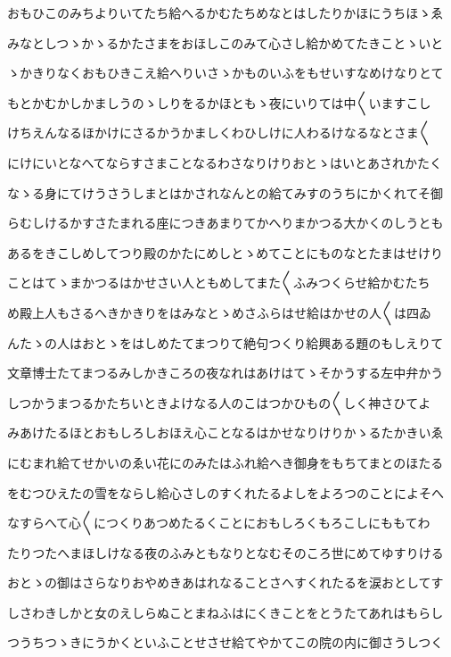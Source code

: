 \documentclass[a4paper,11pt,landscape]{ltjtarticle}
\begin{document}
おもひこのみちよりいてたち給へるかむたちめなとはしたりかほにうちほゝゑ
\par\medskip
みなとしつゝかゝるかたさまをおほしこのみて心さし給かめてたきことゝいと
\par\medskip
ゝかきりなくおもひきこえ給へりいさゝかものいふをもせいすなめけなりとて
\par\medskip
もとかむかしかましうのゝしりをるかほともゝ夜にいりては中〱いますこし
\par\medskip
けちえんなるほかけにさるかうかましくわひしけに人わるけなるなとさま〱
\par\medskip
にけにいとなへてならすさまことなるわさなりけりおとゝはいとあされかたく
\par\medskip
なゝる身にてけうさうしまとはかされなんとの給てみすのうちにかくれてそ御
\par\medskip
らむしけるかすさたまれる座につきあまりてかへりまかつる大かくのしうとも
\par\medskip
あるをきこしめしてつり殿のかたにめしとゝめてことにものなとたまはせけり
\par\medskip
ことはてゝまかつるはかせさい人ともめしてまた〱ふみつくらせ給かむたち
\par\medskip
め殿上人もさるへきかきりをはみなとゝめさふらはせ給はかせの人〱は四ゐ
\par\medskip
んたゝの人はおとゝをはしめたてまつりて絶句つくり給興ある題のもしえりて
\par\medskip
文章博士たてまつるみしかきころの夜なれはあけはてゝそかうする左中弁かう
\par\medskip
しつかうまつるかたちいときよけなる人のこはつかひもの〱しく神さひてよ
\par\medskip
みあけたるほとおもしろしおほえ心ことなるはかせなりけりかゝるたかきいゑ
\par\medskip
にむまれ給てせかいのゑい花にのみたはふれ給へき御身をもちてまとのほたる
\par\medskip
をむつひえたの雪をならし給心さしのすくれたるよしをよろつのことによそへ
\par\medskip
なすらへて心〱につくりあつめたるくことにおもしろくもろこしにももてわ
\par\medskip
たりつたへまほしけなる夜のふみともなりとなむそのころ世にめてゆすりける
\par\medskip
おとゝの御はさらなりおやめきあはれなることさへすくれたるを涙おとしてす
\par\medskip
しさわきしかと女のえしらぬことまねふはにくきことをとうたてあれはもらし
\par\medskip
つうちつゝきにうかくといふことせさせ給てやかてこの院の内に御さうしつく
\end{document}
